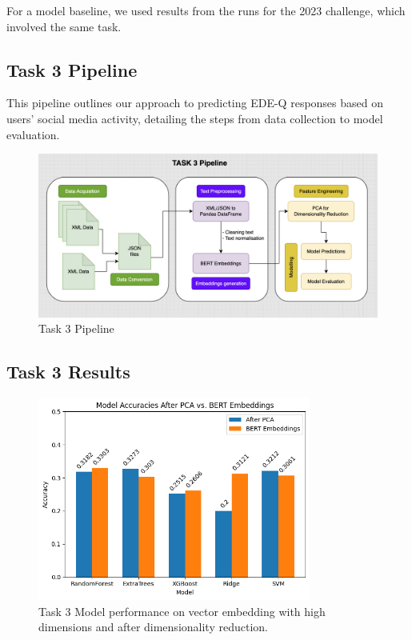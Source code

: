 \documentclass[]{style/ceurart}
\begin{document}
For a model baseline, we used results from the runs for the 2023 challenge, which involved the same task.

\subsection{Task 3 Pipeline}

This pipeline outlines our approach to predicting EDE-Q responses based on users' social media activity, detailing the steps from data collection to model evaluation.

\begin{figure}[h]
\centering
\includegraphics[width=\textwidth]{Task3Pipeline.png}
\caption{Task 3 Pipeline}
\label{fig:example}
\end{figure}

\subsection{Task 3 Results}

\begin{figure}[h]
\centering
\includegraphics[width=0.8\textwidth]{task3ModelRes.png}
\caption{Task 3 Model performance on vector embedding with high dimensions and after dimensionality reduction.}
\label{fig:example}
\end{figure}
\end{document}
